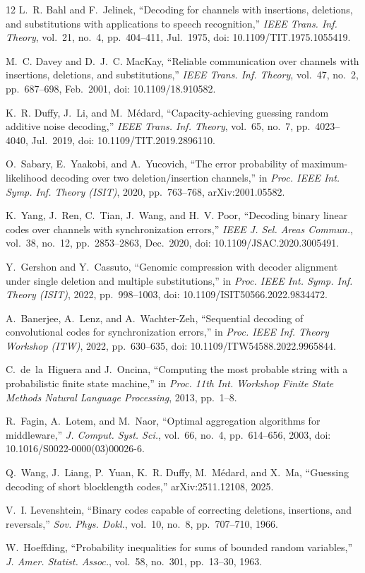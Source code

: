 \documentclass[conference]{IEEEtran}
\begin{document}
\balance
\begin{thebibliography}{12}
L.~R. Bahl and F.~Jelinek, ``Decoding for channels with insertions, deletions, and substitutions
with applications to speech recognition,'' \emph{IEEE Trans. Inf. Theory}, vol.~21, no.~4,
pp.~404--411, Jul.~1975, doi: 10.1109/TIT.1975.1055419.

M.~C. Davey and D.~J.~C. MacKay, ``Reliable communication over channels with insertions,
deletions, and substitutions,'' \emph{IEEE Trans. Inf. Theory}, vol.~47, no.~2, pp.~687--698,
Feb.~2001, doi: 10.1109/18.910582.

K.~R. Duffy, J.~Li, and M.~M\'edard, ``Capacity-achieving guessing random additive noise
decoding,'' \emph{IEEE Trans. Inf. Theory}, vol.~65, no.~7, pp.~4023--4040, Jul.~2019,
doi: 10.1109/TIT.2019.2896110.

O.~Sabary, E.~Yaakobi, and A.~Yucovich, ``The error probability of maximum-likelihood decoding
over two deletion/insertion channels,'' in \emph{Proc. IEEE Int. Symp. Inf. Theory (ISIT)}, 2020,
pp.~763--768, arXiv:2001.05582.

K.~Yang, J.~Ren, C.~Tian, J.~Wang, and H.~V. Poor, ``Decoding binary linear codes over channels
with synchronization errors,'' \emph{IEEE J. Sel. Areas Commun.}, vol.~38, no.~12,
pp.~2853--2863, Dec.~2020, doi: 10.1109/JSAC.2020.3005491.

Y.~Gershon and Y.~Cassuto, ``Genomic compression with decoder alignment under single deletion and
multiple substitutions,'' in \emph{Proc. IEEE Int. Symp. Inf. Theory (ISIT)}, 2022,
pp.~998--1003, doi: 10.1109/ISIT50566.2022.9834472.

A.~Banerjee, A.~Lenz, and A.~Wachter-Zeh, ``Sequential decoding of convolutional codes for
synchronization errors,'' in \emph{Proc. IEEE Inf. Theory Workshop (ITW)}, 2022,
pp.~630--635, doi: 10.1109/ITW54588.2022.9965844.

C.~de~la~Higuera and J.~Oncina, ``Computing the most probable string with a probabilistic finite
state machine,'' in \emph{Proc. 11th Int. Workshop Finite State Methods Natural Language
Processing}, 2013, pp.~1--8.

R.~Fagin, A.~Lotem, and M.~Naor, ``Optimal aggregation algorithms for middleware,''
\emph{J. Comput. Syst. Sci.}, vol.~66, no.~4, pp.~614--656, 2003,
doi: 10.1016/S0022-0000(03)00026-6.

Q.~Wang, J.~Liang, P.~Yuan, K.~R. Duffy, M.~M\'edard, and X.~Ma, ``Guessing decoding of short
blocklength codes,'' arXiv:2511.12108, 2025.

V.~I. Levenshtein, ``Binary codes capable of correcting deletions, insertions, and reversals,''
\emph{Sov. Phys. Dokl.}, vol.~10, no.~8, pp.~707--710, 1966.

W.~Hoeffding, ``Probability inequalities for sums of bounded random variables,''
\emph{J. Amer. Statist. Assoc.}, vol.~58, no.~301, pp.~13--30, 1963.
\end{thebibliography}
\end{document}
